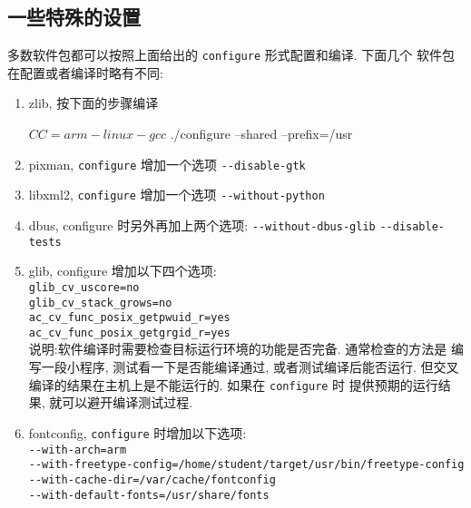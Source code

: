 \subsection{一些特殊的设置}
多数软件包都可以按照上面给出的 \verb|configure| 形式配置和编译. 下面几个
软件包在配置或者编译时略有不同:
\begin{enumerate}
    \item zlib, 按下面的步骤编译
\begin{blockcode}
$ CC=arm-linux-gcc
$ ./configure --shared --prefix=/usr
\end{blockcode}
    \item pixman, \verb|configure| 增加一个选项 \verb|--disable-gtk|

    \item libxml2, \verb|configure| 增加一个选项 \verb|--without-python|

    \item dbus,  configure 时另外再加上两个选项:
        \verb|--without-dbus-glib|  \verb|--disable-tests|

    \item glib, configure 增加以下四个选项:\\
        \verb|glib_cv_uscore=no|\\
        \verb|glib_cv_stack_grows=no|\\
        \verb|ac_cv_func_posix_getpwuid_r=yes|\\
        \verb|ac_cv_func_posix_getgrgid_r=yes|\\

        说明:软件编译时需要检查目标运行环境的功能是否完备. 通常检查的方法是
        编写一段小程序, 测试看一下是否能编译通过, 或者测试编译后能否运行.
        但交叉编译的结果在主机上是不能运行的. 如果在 \verb|configure| 时
        提供预期的运行结果, 就可以避开编译测试过程.

    \item fontconfig, \verb|configure| 时增加以下选项:\\
        \verb|--with-arch=arm|\\
        \verb|--with-freetype-config=/home/student/target/usr/bin/freetype-config|\\
        \verb|--with-cache-dir=/var/cache/fontconfig|\\
        \verb|--with-default-fonts=/usr/share/fonts|


\end{enumerate}

